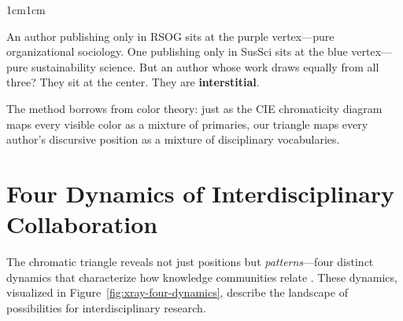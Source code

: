 \documentclass[../main.tex]{subfiles}
\begin{document}
\begin{adjustwidth}{1cm}{1cm}
\begin{center}
\begin{tikzpicture}[scale=1.2]
\end{tikzpicture}
\end{center}


An author publishing only in RSOG sits at the purple vertex---pure organizational sociology. One publishing only in SusSci sits at the blue vertex---pure sustainability science. But an author whose work draws equally from all three? They sit at the center. They are \textbf{interstitial}.

The method borrows from color theory: just as the CIE chromaticity diagram maps every visible color as a mixture of primaries, our triangle maps every author's discursive position as a mixture of disciplinary vocabularies.

\vspace{0.8cm}

\section*{Four Dynamics of Interdisciplinary Collaboration}

The chromatic triangle reveals not just positions but \textit{patterns}---four distinct dynamics that characterize how knowledge communities relate . These dynamics, visualized in Figure~\ref{fig:xray-four-dynamics}, describe the landscape of possibilities for interdisciplinary research.

\begin{center}
\end{center}
\end{adjustwidth}
\end{document}
